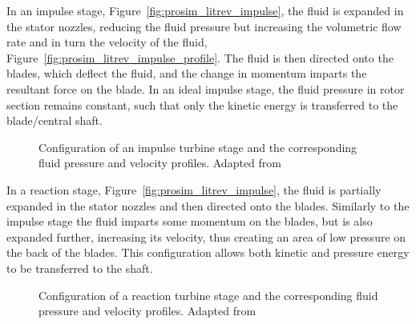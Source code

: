         In an impulse stage, Figure~\ref{fig:prosim_litrev_impulse}, the fluid is expanded in the stator nozzles, reducing the fluid pressure but increasing the volumetric flow rate and in turn the velocity of the fluid, Figure~\ref{fig:prosim_litrev_impulse_profile}. The fluid is then directed onto the blades, which deflect the fluid, and the change in momentum imparts the resultant force on the blade. In an ideal impulse stage, the fluid pressure in rotor section remains constant, such that only the kinetic energy is transferred to the blade/central shaft. 
        
        \begin{figure}[H]
            \centering
            \quad
            \caption[Configuration of an impulse turbine stage and the corresponding fluid pressure and velocity profiles.]{Configuration of an impulse turbine stage and the corresponding fluid pressure and velocity profiles. Adapted from \cite{Dick2015, Smith2005}}
            \label{fig:prosim_litrev_impulse_turbine_stage}
        \end{figure}
        
        In a reaction stage, Figure~\ref{fig:prosim_litrev_impulse}, the fluid is partially expanded in the stator nozzles and then directed onto the blades. Similarly to the impulse stage the fluid imparts some momentum on the blades, but is also expanded further, increasing its velocity, thus creating an area of low pressure on the back of the blades. This configuration allows both kinetic and pressure energy to be transferred to the shaft.
        
        \begin{figure}[H]
            \centering
            \quad
            \caption[Configuration of a reaction turbine stage and the corresponding fluid pressure and velocity profiles.]{Configuration of a reaction turbine stage and the corresponding fluid pressure and velocity profiles. Adapted from \cite{Dick2015, Smith2005}}
            \label{fig:prosim_litrev_reaction_turbine_stage}
        \end{figure}

